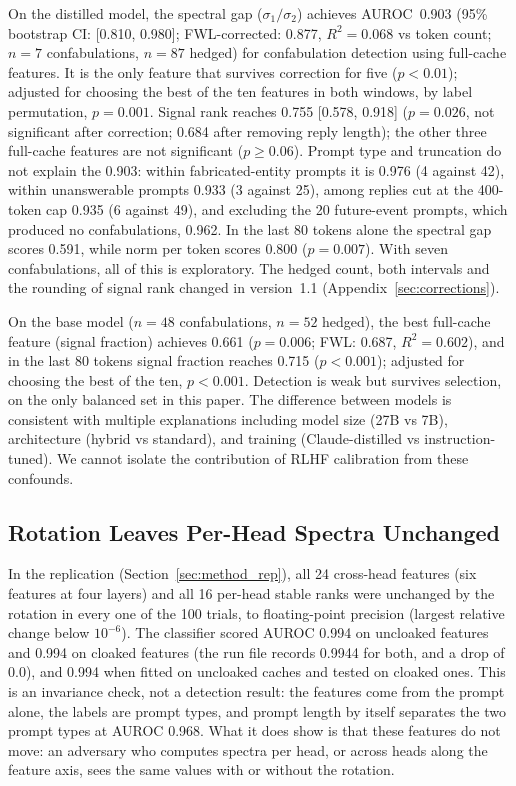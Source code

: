 \documentclass[11pt,a4paper]{article}
\begin{document}
On the distilled model, the spectral gap ($\sigma_1/\sigma_2$) achieves
AUROC~0.903 (95\% bootstrap CI: [0.810, 0.980]; FWL-corrected: 0.877,
$R^2 = 0.068$ vs token count; $n=7$ confabulations, $n=87$ hedged)
for confabulation detection using full-cache features. It is the only
feature that survives correction for five ($p < 0.01$); adjusted for
choosing the best of the ten features in both windows, by label
permutation, $p = 0.001$. Signal rank reaches 0.755 [0.578, 0.918]
($p = 0.026$, not significant after correction; 0.684 after removing
reply length); the other three full-cache features are not significant
($p \geq 0.06$). Prompt type and truncation do not explain the 0.903:
within fabricated-entity prompts it is 0.976 (4 against 42), within
unanswerable prompts 0.933 (3 against 25), among replies cut at the
400-token cap 0.935 (6 against 49), and excluding the 20 future-event
prompts, which produced no confabulations, 0.962. In the last 80 tokens
alone the spectral gap scores 0.591, while norm per token scores 0.800
($p = 0.007$). With seven confabulations, all of this is exploratory.
The hedged count, both intervals and the rounding of signal rank changed
in version~1.1 (Appendix~\ref{sec:corrections}).

On the base model ($n=48$ confabulations, $n=52$ hedged), the best
full-cache feature (signal fraction) achieves 0.661 ($p = 0.006$; FWL:
0.687, $R^2 = 0.602$), and in the last 80 tokens signal fraction reaches
0.715 ($p < 0.001$); adjusted for choosing the best of the ten,
$p < 0.001$. Detection is weak but survives selection, on the only
balanced set in this paper. The difference between models is consistent
with multiple explanations including model size (27B vs 7B), architecture
(hybrid vs standard), and training (Claude-distilled vs
instruction-tuned). We cannot isolate the contribution of RLHF
calibration from these confounds.

\subsection{Rotation Leaves Per-Head Spectra Unchanged}
\label{sec:replication}

In the replication (Section~\ref{sec:method_rep}), all 24 cross-head
features (six features at four layers) and all 16 per-head stable ranks
were unchanged by the rotation in every one of the 100 trials, to
floating-point precision (largest relative change below $10^{-6}$). The
classifier scored AUROC 0.994 on uncloaked features and 0.994 on cloaked
features (the run file records 0.9944 for both, and a drop of 0.0), and
0.994 when fitted on uncloaked caches and tested on cloaked ones. This is
an invariance check, not a detection result: the features come from the
prompt alone, the labels are prompt types, and prompt length by itself
separates the two prompt types at AUROC 0.968. What it does show is that
these features do not move: an adversary who computes spectra per head,
or across heads along the feature axis, sees the same values with or
without the rotation.
\end{document}
